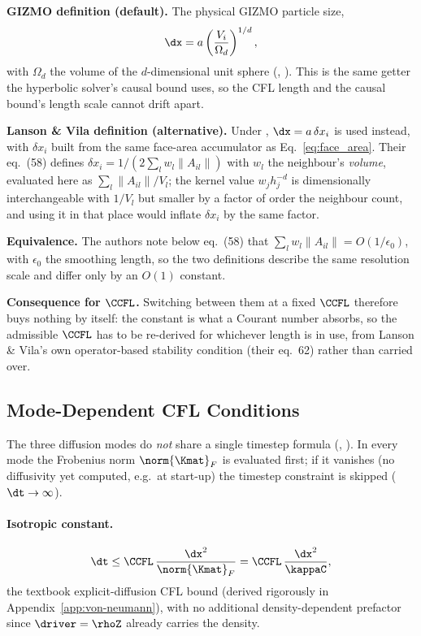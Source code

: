 \textbf{GIZMO definition (default).} The physical GIZMO particle size,
\begin{equation}
  \dx = a \left(\frac{V_i}{\Omega_d}\right)^{1/d} ,
\end{equation}
with $\Omega_d$ the volume of the $d$-dimensional unit sphere
(, ).
This is the same getter the hyperbolic solver's causal bound uses, so
the CFL length and the causal bound's length scale cannot drift apart.

\textbf{Lanson \& Vila definition (alternative).} Under
, $\dx = a\,\delta x_i$ is
used instead, with $\delta x_i$ built from the same face-area
accumulator as Eq.~\eqref{eq:face_area}. Their eq.~(58) defines
$\delta x_i = 1/(2\sum_l w_l\|A_{il}\|)$ with $w_l$ the neighbour's
\emph{volume}, evaluated here as $\sum_l\|A_{il}\|/V_l$; the kernel
value $w_jh_j^{-d}$ is dimensionally interchangeable with $1/V_l$ but
smaller by a factor of order the neighbour count, and using it in that
place would inflate $\delta x_i$ by the same factor.

\textbf{Equivalence.} The authors note below eq.~(58) that
$\sum_l w_l\|A_{il}\| = O(1/\epsilon_0)$, with $\epsilon_0$ the
smoothing length, so the two definitions describe the same resolution
scale and differ only by an $O(1)$ constant.

\textbf{Consequence for $\CCFL$.} Switching between them at a fixed
$\CCFL$ therefore buys nothing by itself: the constant is what a
Courant number absorbs, so the admissible $\CCFL$ has to be re-derived
for whichever length is in use, from Lanson \& Vila's own
operator-based stability condition (their eq.~62) rather than carried
over.

\subsection{Mode-Dependent CFL Conditions}
\label{sec:cfl-modes}
The three diffusion modes do \emph{not} share a single timestep formula
(, ).
In every mode the Frobenius norm $\norm{\Kmat}_F$ is evaluated first; if
it vanishes (no diffusivity yet computed, e.g.\ at start-up) the
timestep constraint is skipped ($\dt\to\infty$).

\paragraph{Isotropic constant.}
\begin{equation}
  \label{eq:dt_const}
  \dt \le \CCFL\, \frac{\dx^2}{\norm{\Kmat}_F} = \CCFL\, \frac{\dx^2}{\kappaC} ,
\end{equation}
the textbook explicit-diffusion CFL bound (derived rigorously in
Appendix~\ref{app:von-neumann}), with no additional density-dependent
prefactor since $\driver=\rhoZ$ already carries the density.

